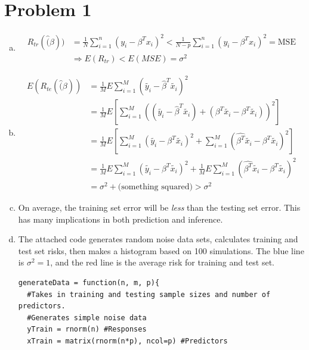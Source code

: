 \documentclass[12pt]{article}
\begin{document}
\begin{center}

\end{center}

\section*{Problem 1}
\begin{enumerate}[(a)]
\item \begin{align*}
	R_{tr} ( \hat(\beta ) ) &= \frac{1}{N} \sum_{i=1}^n \left( y_i - \beta^T x_i \right)^2 
			< \frac{1}{N-p} \sum_{i=1}^n \left( y_i - \beta^T x_i \right)^2 = \text{MSE} \\
			& \Rightarrow E(R_{tr}) < E(MSE) = \sigma^2
	\end{align*}
	
\item \begin{align*}
	E ( R_{te}( \hat(\beta ) ) &= 
	\frac{1}{M} E \sum_{i=1}^M \left( \tilde{y_i} - \hat{\beta}^T \tilde{x_i} \right)^2 \\
%
	&= \frac{1}{M} E \left[ \sum_{i=1}^M \left(  \left( \tilde{y_i} - \hat{\beta}^T \tilde{x_i} \right) + \left( \beta^T \tilde{x_i} - \beta^T \tilde{x_i} \right) \right)^2 \right] \\
%	
	&= \frac{1}{M} E \left[ \sum_{i=1}^M \left( \tilde{y_i} - \beta^T \tilde{x_i} \right)^2 + \sum_{i=1}^M \left( \hat{\beta^T} \tilde{x_i} - \beta^T \tilde{x_i} \right)^2 \right] \\
%
	&= \frac{1}{M} E \sum_{i=1}^M \left( \tilde{y_i} - \beta^T \tilde{x_i} \right)^2 +
	\frac{1}{M} E \sum_{i=1}^M \left( \hat{\beta^T} \tilde{x_i} - \beta^T \tilde{x_i} \right)^2 \\
%
	&= \sigma^2 + \text{(something squared)} > \sigma^2
\end{align*}
\item On average, the training set error will be \emph{less} than the testing set error. This has many implications in both prediction and inference.

\item The attached code generates random noise data sets, calculates training and test set risks, then makes a histogram based on 100 simulations. The blue line is $\sigma^2 = 1$, and the red line is the average risk for training and test set.
\begin{lstlisting}
generateData = function(n, m, p){
  #Takes in training and testing sample sizes and number of predictors.
  #Generates simple noise data
  yTrain = rnorm(n) #Responses
  xTrain = matrix(rnorm(n*p), ncol=p) #Predictors
  

\end{lstlisting}
\end{enumerate}
\end{document}
